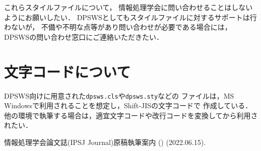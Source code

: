 \documentclass[submit,techreq,noauthor]{dpsws}
\begin{document}
これらスタイルファイルについて，
情報処理学会に問い合わせることはしないようにお願いしたい．
DPSWSとしてもスタイルファイルに対するサポートは行わないが，
不備や不明な点等があり問い合わせが必要である場合には，
DPSWSの問い合わせ窓口にご連絡いただきたい．


\section{文字コードについて}

DPSWS向けに用意された\texttt{dpsws.cls}や\texttt{dpsws.sty}などの
ファイルは，MS Windowsで利用されることを想定し，Shift-JISの文字コードで
作成している．
他の環境で執筆する場合は，適宜文字コードや改行コードを変換してから利用されたい．

\begin{thebibliography}{10}

情報処理学会論文誌(IPSJ Journal)原稿執筆案内
()
(2022.06.15).

\end{thebibliography}
\end{document}
